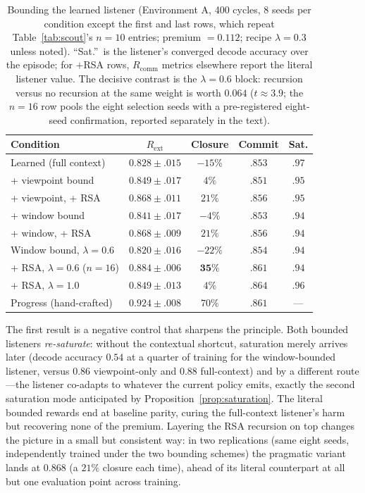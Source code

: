 \documentclass{article}
\newcommand{\Rcomm}{R_{\text{comm}}}
\newcommand{\Rext}{R_{\text{ext}}}
\begin{document}
\begin{table}[t]
\centering
\caption{Bounding the learned listener (Environment A, 400 cycles, 8 seeds per condition except the first and last rows, which repeat Table~\ref{tab:scout}'s $n{=}10$ entries; premium $=0.112$; recipe $\lambda=0.3$ unless noted). ``Sat.''\ is the listener's converged decode accuracy over the episode; for $+$RSA rows, $\Rcomm$ metrics elsewhere report the literal listener value. The decisive contrast is the $\lambda{=}0.6$ block: recursion versus no recursion at the same weight is worth $0.064$ ($t\approx3.9$; the $n{=}16$ row pools the eight selection seeds with a pre-registered eight-seed confirmation, reported separately in the text).}
\label{tab:bounded}
\setlength{\tabcolsep}{2.6pt}
\begin{tabular}{lcccc}
\toprule
\textbf{Condition} & $\Rext$ & Closure & Commit & Sat. \\
\midrule
Learned (full context) & $0.828\pm.015$ & $-15\%$ & $.853$ & $.97$ \\
\;+ viewpoint bound & $0.849\pm.017$ & $4\%$ & $.851$ & $.95$ \\
\;+ viewpoint, + RSA & $0.868\pm.011$ & $21\%$ & $.856$ & $.95$ \\
\;+ window bound & $0.841\pm.017$ & $-4\%$ & $.853$ & $.94$ \\
\;+ window, + RSA & $0.868\pm.009$ & $21\%$ & $.856$ & $.94$ \\
\midrule
Window bound, $\lambda{=}0.6$ & $0.820\pm.016$ & $-22\%$ & $.854$ & $.94$ \\
\;+ RSA, $\lambda{=}0.6$ ($n{=}16$) & $\mathbf{0.884\pm.006}$ & $\mathbf{35\%}$ & $\mathbf{.861}$ & $.94$ \\
\;+ RSA, $\lambda{=}1.0$ & $0.849\pm.013$ & $4\%$ & $.864$ & $.96$ \\
\midrule
Progress (hand-crafted) & $0.924\pm.008$ & $70\%$ & $.861$ & --- \\
\bottomrule
\end{tabular}
\end{table}

The first result is a negative control that sharpens the principle. Both bounded listeners \emph{re-saturate}: without the contextual shortcut, saturation merely arrives later (decode accuracy $0.54$ at a quarter of training for the window-bounded listener, versus $0.86$ viewpoint-only and $0.88$ full-context) and by a different route---the listener co-adapts to whatever the current policy emits, exactly the second saturation mode anticipated by Proposition~\ref{prop:saturation}. The literal bounded rewards end at baseline parity, curing the full-context listener's harm but recovering none of the premium. Layering the RSA recursion on top changes the picture in a small but consistent way: in two replications (same eight seeds, independently trained under the two bounding schemes) the pragmatic variant lands at $0.868$ (a $21\%$ closure each time), ahead of its literal counterpart at all but one evaluation point across training.
\end{document}
